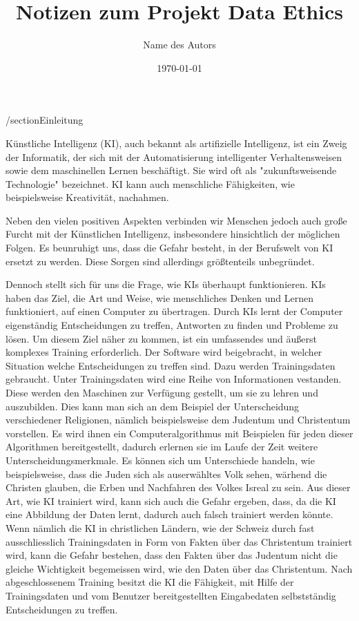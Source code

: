 \documentclass{article}
\title{Notizen zum Projekt Data Ethics}
\author{Name des Autors}
\date{\today}
\begin{document}
\maketitle


\tableofcontents

/section{Einleitung}

Künstliche Intelligenz (KI), auch bekannt als artifizielle Intelligenz, ist ein Zweig der Informatik, der sich mit der Automatisierung intelligenter Verhaltensweisen sowie dem maschinellen Lernen beschäftigt. Sie wird oft als "zukunftsweisende Technologie" bezeichnet. KI kann auch menschliche Fähigkeiten, wie beispielsweise Kreativität, nachahmen.

Neben den vielen positiven Aspekten verbinden wir Menschen jedoch auch große Furcht mit der Künstlichen Intelligenz, insbesondere hinsichtlich der möglichen Folgen. Es beunruhigt uns, dass die Gefahr besteht, in der Berufswelt von KI ersetzt zu werden. Diese Sorgen sind allerdings größtenteils unbegründet.

Dennoch stellt sich für uns die Frage, wie KIs überhaupt funktionieren. KIs haben das Ziel, die Art und Weise, wie menschliches Denken und Lernen funktioniert, auf einen Computer zu übertragen. Durch KIs lernt der Computer eigenständig Entscheidungen zu treffen, Antworten zu finden und Probleme zu lösen. Um diesem Ziel näher zu kommen, ist ein umfassendes und äußerst komplexes Training erforderlich. Der Software wird beigebracht, in welcher Situation welche Entscheidungen zu treffen sind. Dazu werden Trainingsdaten gebraucht. Unter Trainingsdaten wird eine Reihe von Informationen vestanden. Diese werden den Maschinen zur Verfügung gestellt, um sie zu lehren und auszubilden. Dies kann man sich an dem Beispiel der Unterscheidung verschiedener Religionen, nämlich beispielsweise dem Judentum und Christentum vorstellen. Es wird ihnen ein Computeralgorithmus mit Beispielen für jeden dieser Algorithmen bereitgestellt, dadurch erlernen sie im Laufe der Zeit weitere Unterscheidungsmerkmale. Es können sich um Unterschiede handeln, wie beispielsweise, dass die Juden sich als auserwähltes Volk sehen, wärhend die Christen glauben, die Erben und Nachfahren des Volkes Isreal zu sein. Aus dieser Art, wie KI trainiert wird, kann sich auch die Gefahr ergeben, dass, da die KI eine  Abbildung der Daten lernt, dadurch auch falsch trainiert werden könnte. Wenn nämlich die KI in christlichen Ländern, wie der Schweiz durch fast ausschliesslich Trainingsdaten in Form von Fakten über das Christentum trainiert wird, kann die Gefahr bestehen, dass den Fakten über das Judentum nicht die gleiche Wichtigkeit begemeissen wird, wie den Daten über das Christentum. 
Nach abgeschlossenem Training besitzt die KI die Fähigkeit, mit Hilfe der Trainingsdaten und vom Benutzer bereitgestellten Eingabedaten selbstständig Entscheidungen zu treffen.
\end{document}
